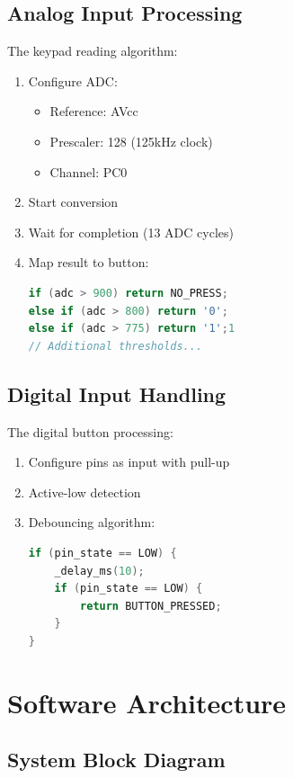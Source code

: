 \documentclass{article}
\begin{document}
\subsection{Analog Input Processing}

The keypad reading algorithm:
\begin{enumerate}
\item Configure ADC:
  \begin{itemize}
  \item Reference: AVcc
  \item Prescaler: 128 (125kHz clock)
  \item Channel: PC0
  \end{itemize}
\item Start conversion
\item Wait for completion (13 ADC cycles)
\item Map result to button:
\begin{lstlisting}[language=C]
if (adc > 900) return NO_PRESS;
else if (adc > 800) return '0';
else if (adc > 775) return '1';1
// Additional thresholds...
\end{lstlisting}
\end{enumerate}

\subsection{Digital Input Handling}

The digital button processing:
\begin{enumerate}
\item Configure pins as input with pull-up
\item Active-low detection
\item Debouncing algorithm:
\begin{lstlisting}[language=C]
if (pin_state == LOW) {
    _delay_ms(10);
    if (pin_state == LOW) {
        return BUTTON_PRESSED;
    }
}
\end{lstlisting}
\end{enumerate}

\section{Software Architecture}
\subsection{System Block Diagram}
\end{document}
